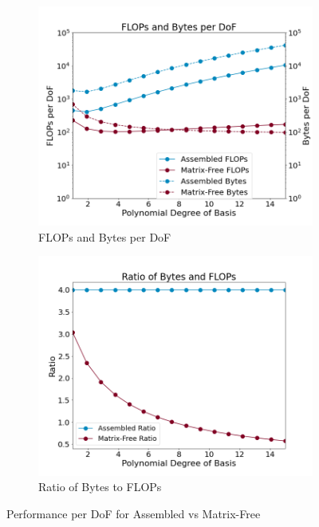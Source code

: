\begin{figure}[ht!]
\begin{subfigure}{.495\textwidth}
\includegraphics[width=.99\linewidth]{../img/assembledVsMatrixFree}
\caption{FLOPs and Bytes per DoF}
\end{subfigure}
\begin{subfigure}{.495\textwidth}
\includegraphics[width=.99\linewidth]{../img/assembledVsMatrixFreeBalance}
\caption{Ratio of Bytes to FLOPs}
\end{subfigure}
\caption{Performance per DoF for Assembled vs Matrix-Free}
\label{fig:assembledvsmatrixfree}
\end{figure}

